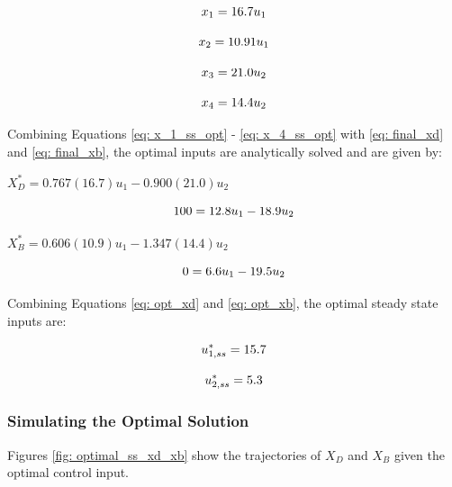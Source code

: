 {
\begin{equation}
    \centering
    x_1 = 16.7u_1
    \label{eq: x_1_ss_opt}
\end{equation}

\begin{equation}
    \centering
    x_2 = 10.91u_1
\end{equation}

\begin{equation}
    \centering
    x_3 = 21.0u_2
\end{equation}

\begin{equation}
    \centering
    x_4 = 14.4u_2
    \label{eq: x_4_ss_opt}
\end{equation}
}

Combining Equations \ref{eq: x_1_ss_opt} - \ref{eq: x_4_ss_opt} with \ref{eq: final_xd} and \ref{eq: final_xb}, the optimal inputs are analytically solved and are given by: \\

{
\centering
$X_D^* = 0.767(16.7)u_1 - 0.900(21.0)u_2$

\begin{equation}
    \centering
    100 = 12.8u_1 - 18.9u_2
    \label{eq: opt_xd}
\end{equation}
}

{
\centering
$X_B^* = 0.606(10.9)u_1 - 1.347(14.4)u_2$

\begin{equation}
    \centering
    0 = 6.6u_1 - 19.5u_2
    \label{eq: opt_xb}
\end{equation}
}

Combining Equations \ref{eq: opt_xd} and \ref{eq: opt_xb}, the optimal steady state inputs are: \\

{
\begin{equation}
    \centering
    u_{1, ss}^* = 15.7
\end{equation}

\begin{equation}
    \centering
    u_{2, ss}^* = 5.3
\end{equation}
}

\subsubsection{Simulating the Optimal Solution}
Figures \ref{fig: optimal_ss_xd_xb} show the trajectories of $X_D$ and $X_B$ given the optimal control input.

